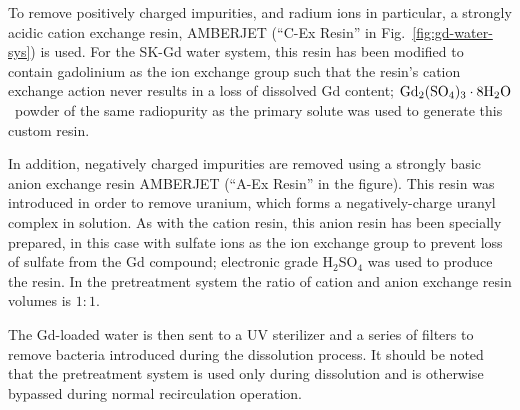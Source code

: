 \documentclass[preprint,12pt]{elsarticle}
\newcommand{\GdSOw}{$\rm Gd_2(\rm SO_4)_3\cdot \rm 8H_2O$\ }
\begin{document}
To remove positively charged impurities, and radium ions in particular,  a strongly acidic cation exchange resin, AMBERJET \cite{organo} (``C-Ex Resin'' in Fig.~\ref{fig:gd-water-sys}) is used.
For the SK-Gd water system, this resin has been modified to contain gadolinium as the ion exchange group such that the resin's cation exchange action never results in a loss of dissolved Gd content;
\GdSOw powder of the same radiopurity as the primary solute was used to generate this custom resin. 

In addition, negatively charged impurities are removed using a strongly basic anion exchange resin AMBERJET \cite{organo2} (``A-Ex Resin'' in the figure).
This resin was introduced in order to remove uranium, which forms a negatively-charge uranyl complex in solution.
As with the cation resin, this anion resin has been specially prepared, in this case with sulfate ions as the ion exchange group to prevent loss of sulfate from the Gd compound; electronic grade  H$_2$SO$_4$ was used to produce the resin.
In the pretreatment system the ratio of cation and anion exchange resin volumes is $1:1$.

 
The Gd-loaded water is then sent to a UV sterilizer and a series of filters to remove bacteria introduced during the dissolution process. 
It should be noted that the pretreatment system is used only during  dissolution and is otherwise bypassed during normal recirculation operation.
\end{document}
